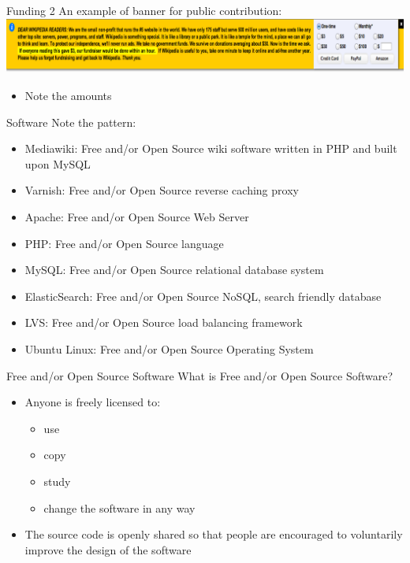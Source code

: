 \documentclass{beamer}
\begin{document}
\begin{frame} {Funding 2}
	An example of banner for public contribution:
	\includegraphics[width=\linewidth]{Goldbanner.png}
	\begin{itemize}
		\pause \item Note the amounts
	\end{itemize}

\end{frame}

\begin{frame} {Software}
	Note the pattern:
	\begin{itemize}
		\pause \item Mediawiki: Free and/or Open Source wiki software written in PHP and built upon MySQL
		\pause \item Varnish: Free and/or Open Source reverse caching proxy
		\pause \item Apache: Free and/or Open Source Web Server
		\pause \item PHP: Free and/or Open Source language
		\pause \item MySQL: Free and/or Open Source relational database system
		\pause \item ElasticSearch: Free and/or Open Source NoSQL, search friendly database
		\pause \item LVS: Free and/or Open Source load balancing framework
		\pause \item Ubuntu Linux: Free and/or Open Source Operating System
	\end{itemize}
\end{frame}

\begin{frame}{Free and/or Open Source Software}
	What is Free and/or Open Source Software?
	\begin{itemize}
		\pause \item Anyone is freely licensed to:
			\begin{itemize}
				\pause \item use
				\pause \item copy
				\pause \item study
				\pause \item change the software in any way
			\end{itemize}
		\pause \item The source code is openly shared so that people are encouraged to voluntarily improve the design of the software
	\end{itemize}
\end{frame}
\end{document}
